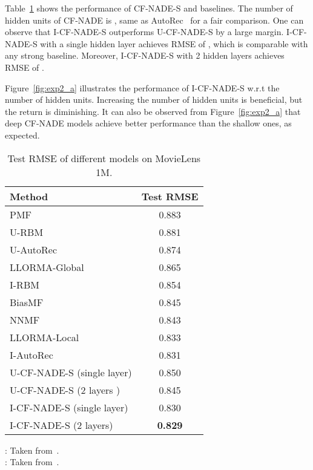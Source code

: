 \documentclass{article}
\newcommand{\cfnade}{CF-NADE\xspace}
\begin{document}
 Table~\ref{tab:movielens1m} shows the performance of {\cfnade}-S and
 baselines. The number of hidden units of \cfnade is , same as
 AutoRec~\citep{sedhain2015autorec} for a fair comparison. One can
 observe that I-{\cfnade}-S outperforms U-{\cfnade}-S by a
 large margin. I-{\cfnade}-S with a single hidden
 layer achieves RMSE of , which is comparable with any strong
 baseline. Moreover, I-{\cfnade}-S with 2 hidden layers achieves RMSE of .

 Figure~\ref{fig:exp2_a} illustrates the performance of I-{\cfnade}-S
 w.r.t the number of hidden units. Increasing the number of hidden
 units is beneficial, but the return is
 diminishing. It can also be observed from Figure~\ref{fig:exp2_a} that deep \cfnade models
 achieve better performance than the shallow ones, as expected.


\begin{table}[h]
 \caption{Test RMSE of different models on MovieLens 1M.}
 \label{tab:movielens1m}
 \begin{center}
 \begin{small}
 \begin{sc}
 \begin{tabular}{lc}
 \hline
 \abovespace\belowspace
 Method & Test RMSE  \\
 \hline
 \abovespace
 PMF    & 0.883 \\
 U-RBM & 0.881\\
 U-AutoRec~\citep{sedhain2015autorec} & 0.874\\
 LLORMA-Global~\citep{lee2013local} & 0.865\\
 I-RBM & 0.854\\
 BiasMF  & 0.845\\
 NNMF~\citep{dziugaite2015neural} &0.843\\
 LLORMA-Local~\citep{lee2013local} & 0.833\\
 \belowspace
 I-AutoRec~\citep{sedhain2015autorec} & 0.831\\
 U-{\cfnade}-S (single layer)  & 0.850 \\
 U-{\cfnade}-S (2 layers )  & 0.845 \\
 I-{\cfnade}-S (single layer) & 0.830\\
 I-{\cfnade}-S (2 layers) & {\bf 0.829}\\
 \hline
 \end{tabular}
 \end{sc}
 \end{small}
 \begin{minipage}{0.48\textwidth}
{\small
: Taken from~\citep{dziugaite2015neural}. \\
: Taken from~\citep{sedhain2015autorec}.
}
\end{minipage}
 \end{center}
 \end{table}
 
\end{document}
